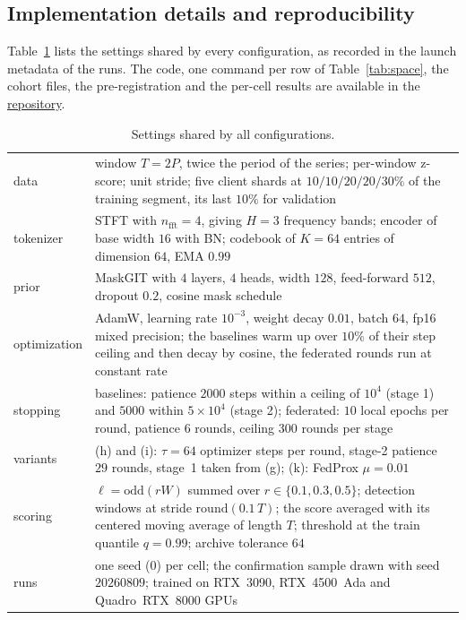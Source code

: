 \documentclass[conference]{IEEEtran}
\begin{document}
\subsection{Implementation details and reproducibility}
\label{subsec:repro}

Table~\ref{tab:hparams} lists the settings shared by every configuration, as recorded in the launch
metadata of the runs. The code, one command per row of Table~\ref{tab:space}, the cohort files, the pre-registration and the per-cell results are available in the
\href{https://github.com/lrdsch/FedTimeVQVAE-AD}{repository}.

\begin{table}[t]
\caption{Settings shared by all configurations.}
\label{tab:hparams}
\centering
\scriptsize
\setlength{\tabcolsep}{2.2pt}
\renewcommand{\arraystretch}{1.0}
\begin{tabular}{@{}l p{6.95cm}@{}}
\hline
data & window $T=2P$, twice the period of the series; per-window z-score; unit stride; five client shards at $10/10/20/20/30\%$ of the training segment, its last $10\%$ for validation \\
tokenizer & STFT with $n_\mathrm{fft}=4$, giving $H=3$ frequency bands; encoder of base width $16$ with BN; codebook of $K=64$ entries of dimension $64$, EMA $0.99$ \\
prior & MaskGIT with $4$ layers, $4$ heads, width $128$, feed-forward $512$, dropout $0.2$, cosine mask schedule \\
optimization & AdamW, learning rate $10^{-3}$, weight decay $0.01$, batch $64$, fp16 mixed precision; the baselines warm up over $10\%$ of their step ceiling and then decay by cosine, the federated rounds run at constant rate \\
stopping & baselines: patience $2000$ steps within a ceiling of $10^4$ (stage 1) and $5000$ within $5\times10^4$ (stage 2); federated: $10$ local epochs per round, patience $6$ rounds, ceiling $300$ rounds per stage \\
variants & (h) and (i): $\tau=64$ optimizer steps per round, stage-2 patience $29$ rounds, stage~1 taken from (g); (k): FedProx $\mu=0.01$ \\
scoring & $\ell=\mathrm{odd}(rW)$ summed over $r\in\{0.1,0.3,0.5\}$; detection windows at stride $\mathrm{round}(0.1\,T)$; the score averaged with its centered moving average of length $T$; threshold at the train quantile $q=0.99$; archive tolerance $64$ \\
runs & one seed ($0$) per cell; the confirmation sample drawn with seed $20260809$; trained on RTX~3090, RTX~4500~Ada and Quadro~RTX~8000 GPUs \\
\hline
\end{tabular}
\end{table}
\end{document}
